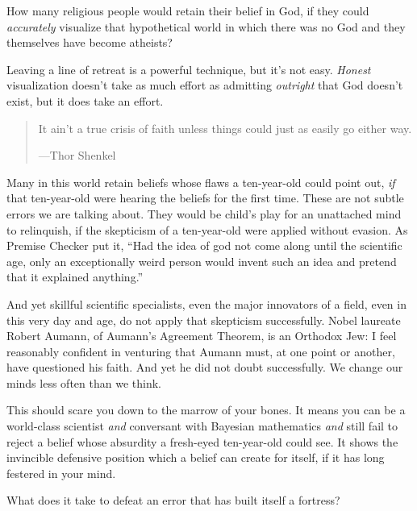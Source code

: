 {
 How many religious people would retain their belief in God, if
they could \textit{accurately} visualize that hypothetical world in
which there was no God and they themselves have become atheists?}

{
 Leaving a line of retreat is a powerful technique, but
it's not easy. \textit{Honest} visualization
doesn't take as much effort as admitting
\textit{outright} that God doesn't exist, but it does
take an effort.}

\myendsectiontext


\bigskip


\begin{quote}
{
 It ain't a true crisis of faith unless things
could just as easily go either way.}

{\raggedleft
 {}---Thor Shenkel
\par}
\end{quote}


{
 Many in this world retain beliefs whose flaws a ten-year-old could
point out, \textit{if} that ten-year-old were hearing the beliefs for
the first time. These are not subtle errors we are talking about. They
would be child's play for an unattached mind to
relinquish, if the skepticism of a ten-year-old were applied without
evasion. As Premise Checker put it, ``Had the idea of
god not come along until the scientific age, only an exceptionally
weird person would invent such an idea and pretend that it explained
anything.''}

{
 And yet skillful scientific specialists, even the major innovators
of a field, even in this very day and age, do not apply that skepticism
successfully. Nobel laureate Robert Aumann, of Aumann's
Agreement Theorem, is an Orthodox Jew: I feel reasonably confident in
venturing that Aumann must, at one point or another, have questioned
his faith. And yet he did not doubt successfully. We change our minds
less often than we think.}

{
 This should scare you down to the marrow of your bones. It means
you can be a world-class scientist \textit{and} conversant with
Bayesian mathematics \textit{and} still fail to reject a belief whose
absurdity a fresh-eyed ten-year-old could see. It shows the invincible
defensive position which a belief can create for itself, if it has long
festered in your mind.}

{
 What does it take to defeat an error that has built itself a
fortress?}

